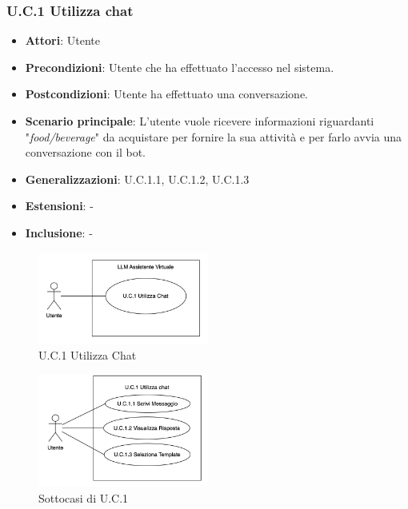 \subsubsection{U.C.1 Utilizza chat} %
\begin{itemize}
    \item \textbf{Attori}: Utente
    \item \textbf{Precondizioni}: Utente che ha effettuato l'accesso nel sistema.
    \item \textbf{Postcondizioni}: Utente ha effettuato una conversazione.
    \item \textbf{Scenario principale}: L'utente vuole ricevere informazioni riguardanti "\textit{food/beverage}" da acquistare per fornire la sua attività e per farlo avvia una conversazione con il bot.
    \item \textbf{Generalizzazioni}: U.C.1.1, U.C.1.2, U.C.1.3
    \item \textbf{Estensioni}: -
    \item \textbf{Inclusione}: -
\end{itemize}
\begin{figure}[H]
    \centering
    \includegraphics[width=0.5\textwidth]{img/UC1.png}
    \caption{U.C.1 Utilizza Chat}
\end{figure}
\begin{figure}[H]
    \centering
    \includegraphics[width=0.5\textwidth]{img/SottocasiUC1.png}
    \caption{Sottocasi di U.C.1}
\end{figure}

